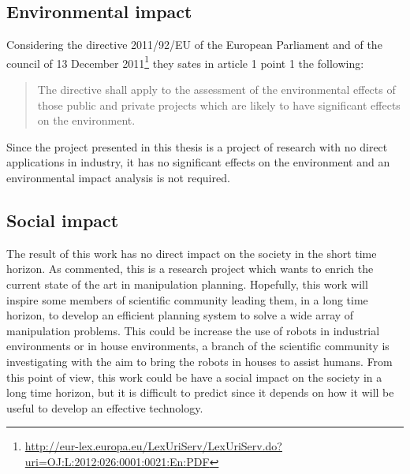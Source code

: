 \subsection*{Environmental impact}
Considering the directive 2011/92/EU of the European Parliament and of the council of 13 December 2011\footnote{\href{http://eur-lex.europa.eu/LexUriServ/LexUriServ.do?uri=OJ:L:2012:026:0001:0021:En:PDF}{\url{http://eur-lex.europa.eu/LexUriServ/LexUriServ.do?uri=OJ:L:2012:026:0001:0021:En:PDF}}}
they sates in article 1 point 1 the following:
\begin{quote}
The directive shall apply to the assessment of the environmental effects of those public and private projects which are likely to have significant effects on the environment.
\end{quote}
Since the project presented in this thesis is a project of research with no direct applications in industry, it has no significant effects on the environment and an environmental impact analysis is not required.

\subsection*{Social impact}
The result of this work has no direct impact on the society in the short time horizon. As commented, this is a research project which wants to enrich the current state of the art in manipulation planning. Hopefully, this work will inspire some members of scientific community leading them, in a long time horizon, to develop an efficient planning system to solve a wide array of manipulation problems. This could be increase the use of robots in industrial environments or in house environments, a branch of the scientific community is investigating with the aim to bring the robots in houses to assist humans. From this point of view, this work could be have a social impact on the society in a long time horizon, but it is difficult to predict since it depends on how it will be useful to develop an effective technology. 
